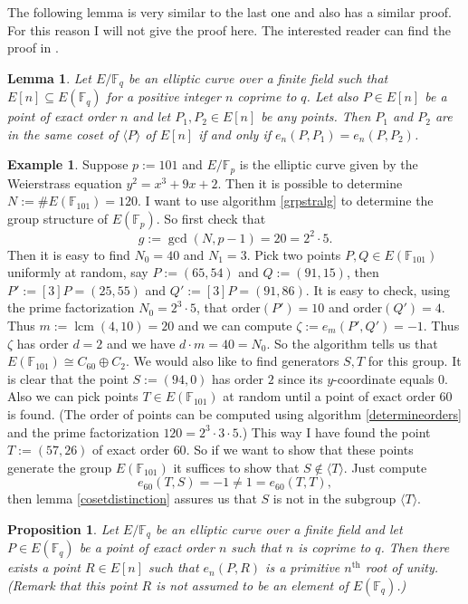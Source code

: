 \documentclass{article}
\numberwithin{equation}{section}
\newtheorem{lemma}[theorem]{Lemma}
\newtheorem{proposition}[theorem]{Proposition}
\theoremstyle{definition}
\newtheorem{example}[theorem]{Example}
\newcommand{\FF}[1]{{\mathbb F}_{#1}} %
\newcommand{\grgen}[1]{\langle #1 \rangle} %
\newcommand{\lcm}{\operatorname{lcm}} %
\begin{document}
The following lemma is very similar to the last one and also has a similar proof. For this reason I will not give the proof here. The interested reader can find the proof in \cite{MOVattack}.

\begin{lemma}\label{2ndcosetdistionction}
Let $E/\FF{q}$ be an elliptic curve over a finite field such that $E[n] \subseteq E(\FF{q})$ for a positive integer $n$ coprime to $q$. Let also $P \in E[n]$ be a point of exact order $n$ and let $P_1,P_2\in E[n]$ be any points. Then $P_1$ and $P_2$ are in the same coset of $\grgen{P}$ of $E[n]$ if and only if $e_n(P,P_1)=e_n(P,P_2)$.  
\end{lemma}

\begin{example}
Suppose $p:=101$ and $E/\FF{p}$ is the elliptic curve given by the Weierstrass equation $y^2=x^3+9x+2$. Then it is possible to determine $N:=\#E(\FF{101})=120$. I want to use algorithm \ref{grpstralg} to determine the group structure of $E(\FF{p})$. So first check that $$g:=\gcd(N,p-1)=20=2^2\cdot5.$$ Then it is easy to find $N_0=40$ and $N_1=3$. Pick two points $P,Q \in E(\FF{101})$ uniformly at random, say $P:=(65,54)$ and $Q:=(91,15)$, then $P':=[3]P=(25,55)$ and $Q':=[3]P=(91,86)$. It is easy to check, using the prime factorization $N_0=2^3\cdot5$, that order$(P')=10$ and order$(Q')=4$. Thus $m:=\lcm(4,10)=20$ and we can compute $\zeta:=e_m(P',Q')=-1$. Thus $\zeta$ has order $d=2$ and we have $d\cdot m=40=N_0$. So the algorithm tells us that $E(\FF{101}) \cong C_{60} \oplus C_2$. We would also like to find generators $S,T$ for this group. It is clear that the point $S:=(94,0)$ has order $2$ since its $y$-coordinate equals $0$. Also we can pick points $T\in E(\FF{101})$ at random until a point of exact order $60$ is found. (The order of points can be computed using algorithm \ref{determineorders} and the prime factorization $120=2^3\cdot3\cdot5$.) This way I have found the point $T:=(57,26)$ of exact order $60$. So if we want to show that these points generate the group $E(\FF{101})$ it suffices to show that $S \notin \grgen{T}$. Just compute $$e_{60}(T,S)=-1 \neq 1= e_{60}(T,T),$$ then lemma \ref{cosetdistinction} assures us that $S$ is not in the subgroup $\grgen{T}$. 
\end{example}

\begin{proposition}
Let $E/\FF{q}$ be an elliptic curve over a finite field and let $P \in E(\FF{q})$ be a point of exact order $n$ such that $n$ is coprime to $q$. Then there exists a point $R \in E[n]$ such that $e_n(P,R)$ is a primitive $n^\text{th}$ root of unity. (Remark that this point $R$ is not assumed to be an element of $E(\FF{q})$.)
\end{proposition}
\end{document}
